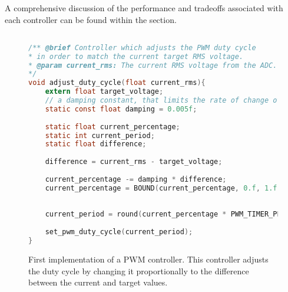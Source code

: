A comprehensive discussion of the performance and tradeoffs associated with each controller can be found within the  section.

\begin{figure}[h]
\begin{lstlisting}[language=C, frame=single, basicstyle=\small, tabsize=2]

/** @brief Controller which adjusts the PWM duty cycle
* in order to match the current target RMS voltage.
* @param current_rms: The current RMS voltage from the ADC.
*/
void adjust_duty_cycle(float current_rms){ 
	extern float target_voltage;
	// a damping constant, that limits the rate of change of the percentage.
	static const float damping = 0.005f;
	
	static float current_percentage;
	static int current_period;
	static float difference;
	
	difference = current_rms - target_voltage;
	
	current_percentage -= damping * difference;
	current_percentage = BOUND(current_percentage, 0.f, 1.f);
	
	
	current_period = round(current_percentage * PWM_TIMER_PERIOD);
	
	set_pwm_duty_cycle(current_period);
}
\end{lstlisting}
\caption{\label{fig:pwm_controller_1_logic} First implementation of a PWM controller. This controller adjusts the duty cycle by changing it proportionally to the difference between the current and target values.}
\end{figure}

